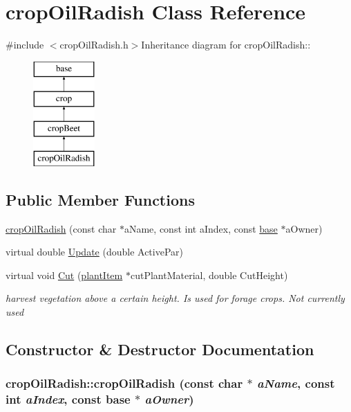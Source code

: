 \hypertarget{classcrop_oil_radish}{
\section{cropOilRadish Class Reference}
\label{classcrop_oil_radish}
}


{\ttfamily \#include $<$cropOilRadish.h$>$}Inheritance diagram for cropOilRadish::\begin{figure}[H]
\begin{center}
\leavevmode
\includegraphics[height=4cm]{classcrop_oil_radish}
\end{center}
\end{figure}
\subsection*{Public Member Functions}
\begin{DoxyCompactItemize}
\item 
\hyperlink{classcrop_oil_radish_ace08e92266f974fb3e9c6bb8af0aac41}{cropOilRadish} (const char $\ast$aName, const int aIndex, const \hyperlink{classbase}{base} $\ast$aOwner)
\item 
virtual double \hyperlink{classcrop_oil_radish_aa699ab0f332d4a9eba58255b99fe2ea2}{Update} (double ActivePar)
\item 
virtual void \hyperlink{classcrop_oil_radish_a3e3ded25f3277d7b8b24fb70900f5138}{Cut} (\hyperlink{classplant_item}{plantItem} $\ast$cutPlantMaterial, double CutHeight)
\begin{DoxyCompactList}\small\item\em harvest vegetation above a certain height. Is used for forage crops. Not currently used \item\end{DoxyCompactList}\end{DoxyCompactItemize}


\subsection{Constructor \& Destructor Documentation}
\hypertarget{classcrop_oil_radish_ace08e92266f974fb3e9c6bb8af0aac41}{
\subsubsection[{cropOilRadish}]{\setlength{\rightskip}{0pt plus 5cm}cropOilRadish::cropOilRadish (const char $\ast$ {\em aName}, \/  const int {\em aIndex}, \/  const {\bf base} $\ast$ {\em aOwner})}}
\label{classcrop_oil_radish_ace08e92266f974fb3e9c6bb8af0aac41}



